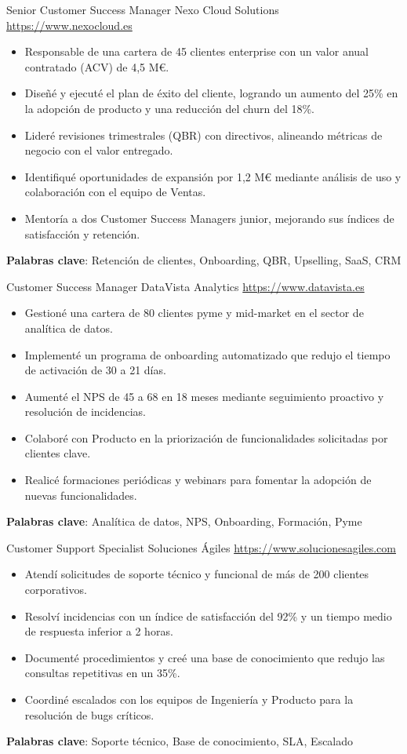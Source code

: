\documentclass[a4paper, serif, 10pt]{moderncv}
\begin{document}
        {Senior Customer Success Manager}
        {Nexo Cloud Solutions}
        {\url{https://www.nexocloud.es}}
        {}
        {\begin{itemize}
\item Responsable de una cartera de 45 clientes enterprise con un valor anual contratado (ACV) de 4,5 M€.
\item Diseñé y ejecuté el plan de éxito del cliente, logrando un aumento del 25\% en la adopción de producto y una reducción del churn del 18\%.
\item Lideré revisiones trimestrales (QBR) con directivos, alineando métricas de negocio con el valor entregado.
\item Identifiqué oportunidades de expansión por 1,2 M€ mediante análisis de uso y colaboración con el equipo de Ventas.
\item Mentoría a dos Customer Success Managers junior, mejorando sus índices de satisfacción y retención.
\end{itemize}
\textbf{Palabras clave}: Retención de clientes, Onboarding, QBR, Upselling, SaaS, CRM}

        {Customer Success Manager}
        {DataVista Analytics}
        {\url{https://www.datavista.es}}
        {}
        {\begin{itemize}
\item Gestioné una cartera de 80 clientes pyme y mid-market en el sector de analítica de datos.
\item Implementé un programa de onboarding automatizado que redujo el tiempo de activación de 30 a 21 días.
\item Aumenté el NPS de 45 a 68 en 18 meses mediante seguimiento proactivo y resolución de incidencias.
\item Colaboré con Producto en la priorización de funcionalidades solicitadas por clientes clave.
\item Realicé formaciones periódicas y webinars para fomentar la adopción de nuevas funcionalidades.
\end{itemize}
\textbf{Palabras clave}: Analítica de datos, NPS, Onboarding, Formación, Pyme}

        {Customer Support Specialist}
        {Soluciones Ágiles}
        {\url{https://www.solucionesagiles.com}}
        {}
        {\begin{itemize}
\item Atendí solicitudes de soporte técnico y funcional de más de 200 clientes corporativos.
\item Resolví incidencias con un índice de satisfacción del 92\% y un tiempo medio de respuesta inferior a 2 horas.
\item Documenté procedimientos y creé una base de conocimiento que redujo las consultas repetitivas en un 35\%.
\item Coordiné escalados con los equipos de Ingeniería y Producto para la resolución de bugs críticos.
\end{itemize}
\textbf{Palabras clave}: Soporte técnico, Base de conocimiento, SLA, Escalado}
\end{document}
